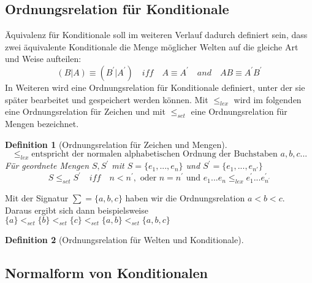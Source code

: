 \documentclass[12pt,a4paper]{article}
\newtheorem{theorem}{Definition}
\begin{document}
\subsection{Ordnungsrelation für Konditionale}
Äquivalenz für Konditionale soll im weiteren Verlauf dadurch definiert sein, dass zwei äquivalente Konditionale die Menge möglicher Welten auf die gleiche Art und Weise aufteilen:
\begin{equation}
(B|A)\equiv (B^\prime|A^\prime) \quad iff \quad A\equiv A^\prime \quad and \quad AB \equiv A^\prime B^\prime
\end{equation}
In Weiteren wird eine Ordnungsrelation für Konditionale definiert, unter der sie später bearbeitet und gespeichert werden können. Mit $\leq_{lex}$ wird im folgenden eine Ordnungsrelation für Zeichen und mit  $\leq_{set}$ eine Ordnungsrelation für Mengen bezeichnet.
\begin{theorem}[Ordnungsrelation für Zeichen und Mengen]
\begin{equation}\leq_{lex} \text{entspricht der normalen alphabetischen Ordnung der Buchstaben \ } a, b, c ...
\end{equation}
Für geordnete Mengen $S, S^\prime$ mit $S = \{e_1, ..., e_n\}$ und $S^\prime = \{e_{1}, ... , e_{n\prime}\}$
\begin{equation}
 S \leq_{set} S ^\prime \quad iff \quad n<n^\prime, \text{ oder } n = n ^\prime \text{ und } e_1...e_n  \leq_{lex}  e_1^\prime ... e_{n^\prime}^\prime
\end{equation}
\end{theorem}
Mit der Signatur $\sum = \{ a, b, c\}$ haben wir die Ordnungsrelation $a<b<c$. Daraus ergibt sich dann beispielsweise $\{a\} <_{set} \{b\} <_{set} \{c\} <_{set} \{a,b\} <_{set} \{a, b, c\}$

\begin{theorem}[Ordnungsrelation für Welten und Konditionale]

\end{theorem}
\subsection{Normalform von Konditionalen}
\end{document}
